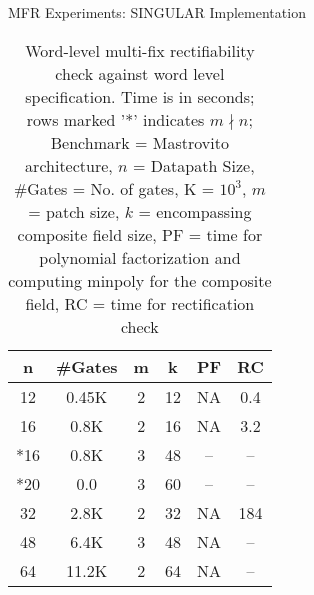 \begin{frame}{\large MFR Experiments: SINGULAR Implementation}

{\small
\begin{table}[]
\centering
\caption{{\footnotesize Word-level multi-fix rectifiability check against word level specification. Time is in seconds; rows marked '*' indicates $m \nmid n$; Benchmark = Mastrovito architecture, $n$ = Datapath Size, \#Gates = No. of gates, K = $10^3$, $m$ = patch size, $k$ = encompassing composite field size, PF = time for polynomial factorization and computing minpoly for the composite field, RC = time for rectification check}}
\label{masusmontspec}
\begin{tabular}{| c | c | c | c | c | c |} \hline
{\textbf{n}}& {\textbf{\#Gates}} & {\textbf{m}} & {\textbf{k}} & {\textbf{PF}} & {\textbf{RC}} \\ \hline 
12  & 0.45K & 2 & 12  & NA & 0.4\\ \hline
16  & 0.8K & 2 & 16  & NA & 3.2 \\ \hline
*16 & 0.8K & 3 & 48  & -- & --  \\ \hline
*20 & 0.0 & 3 & 60  & -- & --   \\ \hline
32  & 2.8K & 2 & 32  & NA & 184 \\ \hline
48  & 6.4K & 3 & 48  & NA & --  \\ \hline
64  & 11.2K & 2 & 64  & NA & -- \\ \hline
\end{tabular}
\end{table}}

\end{frame}

